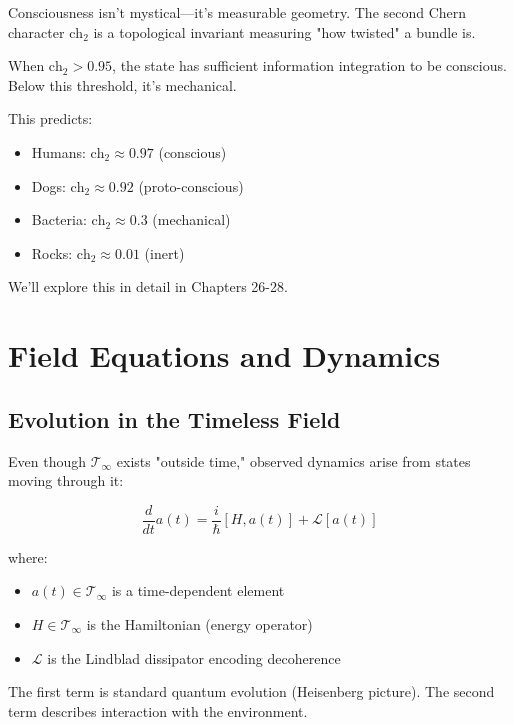 \begin{keyidea}
Consciousness isn't mystical—it's measurable geometry. The second Chern character $\text{ch}_2$ is a topological invariant measuring "how twisted" a bundle is.

When $\text{ch}_2 > 0.95$, the state has sufficient information integration to be conscious. Below this threshold, it's mechanical.

This predicts:
\begin{itemize}
\item Humans: $\text{ch}_2 \approx 0.97$ (conscious)
\item Dogs: $\text{ch}_2 \approx 0.92$ (proto-conscious)
\item Bacteria: $\text{ch}_2 \approx 0.3$ (mechanical)
\item Rocks: $\text{ch}_2 \approx 0.01$ (inert)
\end{itemize}

We'll explore this in detail in Chapters 26-28.
\end{keyidea}

\section{Field Equations and Dynamics}
\label{sec:field-equations}

\subsection{Evolution in the Timeless Field}

Even though $\mathcal{T}_\infty$ exists "outside time," observed dynamics arise from states moving through it:

\begin{equation}\label{eq:field-evolution}
\frac{d}{dt}a(t) = \frac{i}{\hbar}[H, a(t)] + \mathcal{L}[a(t)]
\end{equation}

where:
\begin{itemize}
\item $a(t) \in \mathcal{T}_\infty$ is a time-dependent element
\item $H \in \mathcal{T}_\infty$ is the Hamiltonian (energy operator)
\item $\mathcal{L}$ is the Lindblad dissipator encoding decoherence
\end{itemize}

The first term is standard quantum evolution (Heisenberg picture). The second term describes interaction with the environment.

